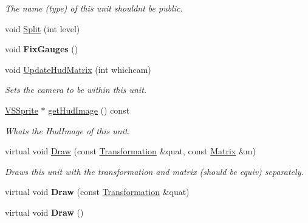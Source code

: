 \begin{DoxyCompactItemize}
\begin{DoxyCompactList}\small\item\em The name (type) of this unit shouldn\textquotesingle{}t be public. \end{DoxyCompactList}\item 
void \hyperlink{classGameUnit_ab589dae4fc04c31898c7bf23e6f8cb46}{Split} (int level)
\item 
void {\bfseries Fix\+Gauges} ()\hypertarget{classGameUnit_a0526b5472cf9a1776baa694e1e127d89}{}\label{classGameUnit_a0526b5472cf9a1776baa694e1e127d89}

\item 
void \hyperlink{classGameUnit_a3737ac418f41325367169998f7131202}{Update\+Hud\+Matrix} (int whichcam)\hypertarget{classGameUnit_a3737ac418f41325367169998f7131202}{}\label{classGameUnit_a3737ac418f41325367169998f7131202}

\begin{DoxyCompactList}\small\item\em Sets the camera to be within this unit. \end{DoxyCompactList}\item 
\hyperlink{classVSSprite}{V\+S\+Sprite} $\ast$ \hyperlink{classGameUnit_af8a022384d903e6549b217fa5410b3e0}{get\+Hud\+Image} () const \hypertarget{classGameUnit_af8a022384d903e6549b217fa5410b3e0}{}\label{classGameUnit_af8a022384d903e6549b217fa5410b3e0}

\begin{DoxyCompactList}\small\item\em What\textquotesingle{}s the Hud\+Image of this unit. \end{DoxyCompactList}\item 
virtual void \hyperlink{classGameUnit_a86e85603e44428c44307e0e69cf42dc7}{Draw} (const \hyperlink{structTransformation}{Transformation} \&quat, const \hyperlink{classMatrix}{Matrix} \&m)
\begin{DoxyCompactList}\small\item\em Draws this unit with the transformation and matrix (should be equiv) separately. \end{DoxyCompactList}\item 
virtual void {\bfseries Draw} (const \hyperlink{structTransformation}{Transformation} \&quat)\hypertarget{classGameUnit_ae6f888087ba2d006da70f51cffb6066d}{}\label{classGameUnit_ae6f888087ba2d006da70f51cffb6066d}

\item 
virtual void {\bfseries Draw} ()\hypertarget{classGameUnit_ab482c73133174c5d2593af5b54adfa1b}{}\label{classGameUnit_ab482c73133174c5d2593af5b54adfa1b}


\end{DoxyCompactItemize}
